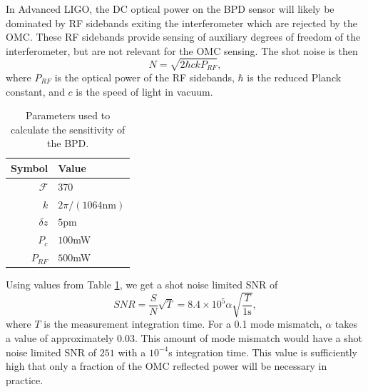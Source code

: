 In Advanced LIGO, the DC optical power on the BPD sensor will likely be dominated by RF sidebands exiting the interferometer which are rejected by the OMC. %
These RF sidebands provide sensing of auxiliary degrees of freedom of the interferometer, but are not relevant for the OMC sensing. %
The shot noise is then
\begin{equation}
N = \sqrt{2 \hbar c k P_{RF}},
\end{equation}
where $P_{RF}$ is the optical power of the RF sidebands, $\hbar$ is the reduced Planck constant, and $c$ is the speed of light in vacuum.

\begin{table}
  \begin{center}
    \begin{tabular}{|r|l|}
      \hline
      Symbol & Value \\
      \hline
      $\mathcal{F}$ &  370\\
      $k$ &  $2\pi/(1064\text{nm})$\\
      $\delta z$ &  $5$pm\\
      $P_c$ &  $100$mW \\
      $P_{RF}$ &  $500$mW \\
      \hline
    \end{tabular}
  \caption{Parameters used to calculate the sensitivity of the BPD.}
  \label{tab:values}
  \end{center}
\end{table}

Using values from Table \ref{tab:values}, we get a shot noise limited SNR of
\begin{equation}
SNR =\frac{S}{N}\sqrt{T}= 8.4\times 10^5 \alpha \sqrt{\frac{T}{1\text{s}}},
\end{equation}
where $T$ is the measurement integration time. %
For a 0.1\perc{} mode mismatch, $\alpha$ takes a value of approximately $0.03$. %
This amount of mode mismatch would have a shot noise limited SNR of $251$ with a $10^{-4}$s integration time. %
This value is sufficiently high that only a fraction of the OMC reflected power will be necessary in practice.

